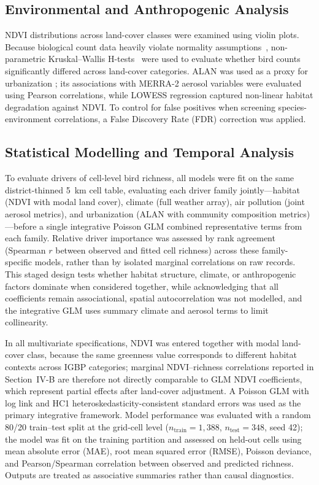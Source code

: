 \documentclass[conference]{IEEEtran}
\begin{document}
\subsection{Environmental and Anthropogenic Analysis}

NDVI distributions across land-cover classes were examined using violin plots. Because biological count data heavily violate normality assumptions~\cite{ref17}, non-parametric Kruskal--Wallis H-tests~\cite{ref23} were used to evaluate whether bird counts significantly differed across land-cover categories. ALAN was used as a proxy for urbanization \cite{ref11}; its associations with MERRA-2 aerosol variables were evaluated using Pearson correlations, while LOWESS regression captured non-linear habitat degradation against NDVI. To control for false positives when screening species-environment correlations, a False Discovery Rate (FDR) correction was applied.

\subsection{Statistical Modelling and Temporal Analysis}

To evaluate drivers of cell-level bird richness, all models were fit on the same district-thinned 5~km cell table, evaluating each driver family jointly---habitat (NDVI with modal land cover), climate (full weather array), air pollution (joint aerosol metrics), and urbanization (ALAN with community composition metrics)---before a single integrative Poisson GLM combined representative terms from each family. Relative driver importance was assessed by rank agreement (Spearman $r$ between observed and fitted cell richness) across these family-specific models, rather than by isolated marginal correlations on raw records. This staged design tests whether habitat structure, climate, or anthropogenic factors dominate when considered together, while acknowledging that all coefficients remain associational, spatial autocorrelation was not modelled, and the integrative GLM uses summary climate and aerosol terms to limit collinearity.

In all multivariate specifications, NDVI was entered together with modal land-cover class, because the same greenness value corresponds to different habitat contexts across IGBP categories; marginal NDVI--richness correlations reported in Section~IV-B are therefore not directly comparable to GLM NDVI coefficients, which represent partial effects after land-cover adjustment. A Poisson GLM with log link and HC1 heteroskedasticity-consistent standard errors \cite{ref19} was used as the primary integrative framework. Model performance was evaluated with a random 80/20 train--test split at the grid-cell level ($n_{\mathrm{train}} = 1{,}388$, $n_{\mathrm{test}} = 348$, seed 42); the model was fit on the training partition and assessed on held-out cells using mean absolute error (MAE), root mean squared error (RMSE), Poisson deviance, and Pearson/Spearman correlation between observed and predicted richness. Outputs are treated as associative summaries rather than causal diagnostics.
\end{document}
